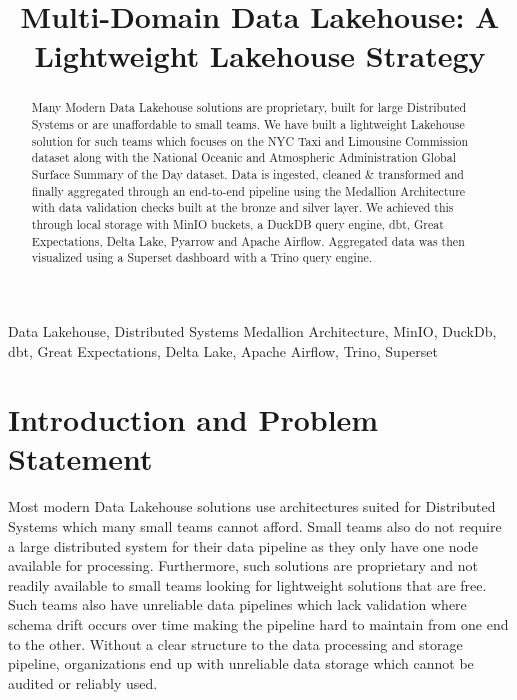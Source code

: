 \documentclass[conference]{IEEEtran}
\begin{document}
\title{Multi-Domain Data Lakehouse: 
A Lightweight Lakehouse Strategy}

\author{
}

\maketitle

\begin{abstract}
Many Modern Data Lakehouse solutions are proprietary, built for large Distributed Systems or are unaffordable to small teams. We have built a lightweight Lakehouse solution for such teams which focuses on the NYC Taxi and Limousine Commission dataset along with the National Oceanic and Atmospheric Administration Global Surface Summary of the Day dataset. Data is ingested, cleaned \& transformed and finally aggregated through an end-to-end pipeline using the Medallion Architecture with data validation checks built at the bronze and silver layer. We achieved this through local storage with MinIO buckets, a DuckDB query engine, dbt, Great Expectations, Delta Lake, Pyarrow and Apache Airflow. Aggregated data was then visualized using a Superset dashboard with a Trino query engine.  
\end{abstract}

\begin{IEEEkeywords}
Data Lakehouse, Distributed Systems Medallion Architecture, MinIO, DuckDb, dbt, Great Expectations, Delta Lake, Apache Airflow, Trino, Superset
\end{IEEEkeywords}

\section{Introduction and Problem Statement}
\label{sec:intro}

Most modern Data Lakehouse solutions use architectures suited for Distributed Systems which many small teams cannot afford. Small teams also do not require a large distributed system for their data pipeline as they only have one node available for processing. Furthermore, such solutions are proprietary and not readily available to small teams looking for lightweight solutions that are free. Such teams also have unreliable data pipelines which lack validation where schema drift occurs over time making the pipeline hard to maintain from one end to the other. Without a clear structure to the data processing and storage pipeline, organizations end up with unreliable data storage which cannot be audited or reliably used.
\end{document}
